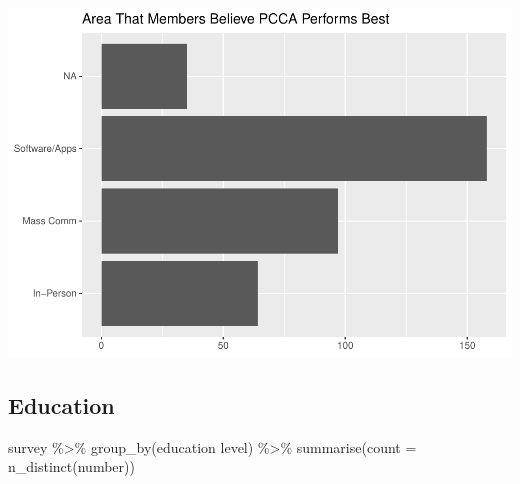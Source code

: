 \documentclass[
]{article}
\newenvironment{Shaded}{\begin{snugshade}}{\end{snugshade}}
\newcommand{\AttributeTok}[1]{\textcolor[rgb]{0.77,0.63,0.00}{#1}}
\newcommand{\FunctionTok}[1]{\textcolor[rgb]{0.00,0.00,0.00}{#1}}
\newcommand{\NormalTok}[1]{#1}
\newcommand{\SpecialCharTok}[1]{\textcolor[rgb]{0.00,0.00,0.00}{#1}}
\newcommand{\StringTok}[1]{\textcolor[rgb]{0.31,0.60,0.02}{#1}}
\begin{document}
\includegraphics{pcca_survey_files/figure-latex/best-all-1.pdf}

\hypertarget{education}{%
\subsection{Education}\label{education}}

\begin{Shaded}
\begin{Highlighting}[]
\NormalTok{survey }\SpecialCharTok{\%\textgreater{}\%}
    \FunctionTok{group\_by}\NormalTok{(}\StringTok{\textasciigrave{}}\AttributeTok{education level}\StringTok{\textasciigrave{}}\NormalTok{) }\SpecialCharTok{\%\textgreater{}\%}
    \FunctionTok{summarise}\NormalTok{(}\AttributeTok{count =} \FunctionTok{n\_distinct}\NormalTok{(number))}
\end{Highlighting}
\end{Shaded}
\end{document}
